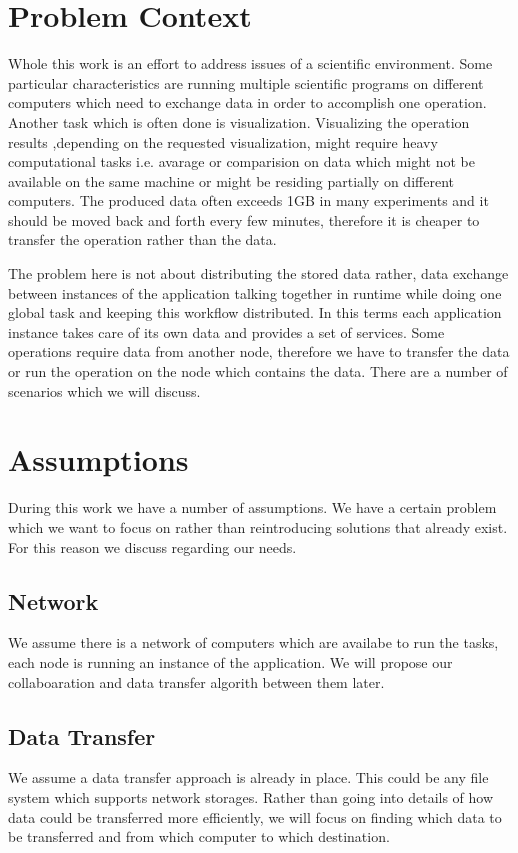 \section{Problem Context}
Whole this work is an effort to address issues of a scientific environment. Some particular characteristics
are running multiple scientific programs on different computers which need to exchange data in order to
accomplish one operation. Another task which is often done is visualization. Visualizing the operation results
,depending on the requested visualization, might require heavy computational tasks i.e. avarage or comparision
on data which might not be available on the same machine or might be residing partially on different computers.
The produced data often exceeds 1GB in many experiments and it should be moved back and forth every few minutes,
therefore it is cheaper to transfer the operation rather than the data.

The problem here is not about distributing the stored data rather, data exchange between instances of the application 
talking together in runtime while doing one global task and keeping this workflow distributed. In this terms each
application instance takes care of its own data and provides a set of services. Some operations require data from
another node, therefore we have to transfer the data or run the operation on the node which contains the data. There
are a number of scenarios which we will discuss.

\section{Assumptions}
During this work we have a number of assumptions. We have a certain problem which we want to focus
on rather than reintroducing solutions that already exist. For this reason we discuss regarding our 
needs.

\subsection{Network}
We assume there is a network of computers which are availabe to run the tasks, each node is running an instance
of the application. We will propose our collaboaration and data transfer algorith between them later.

\subsection{Data Transfer}
We assume a data transfer approach is already in place. This could be any file system which supports 
network storages. Rather than going into details of how data could be transferred more efficiently, we will
focus on finding which data to be transferred and from which computer to which destination.


